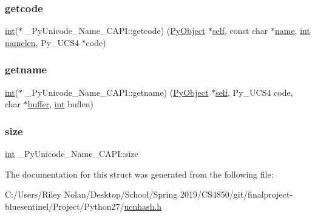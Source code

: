 \subsubsection{\texorpdfstring{getcode}{getcode}}
{\footnotesize\ttfamily \mbox{\hyperlink{warnings_8h_a74f207b5aa4ba51c3a2ad59b219a423b}{int}}($\ast$ \+\_\+\+Py\+Unicode\+\_\+\+Name\+\_\+\+C\+A\+P\+I\+::getcode) (\mbox{\hyperlink{_python27_2object_8h_aadc84ac7aed2cfa6f20c25f62bf3dac7}{Py\+Object}} $\ast$\mbox{\hyperlink{modsupport_8h_a0180ca1808366e5da641475e8bf8cca3}{self}}, const char $\ast$\mbox{\hyperlink{structname}{name}}, \mbox{\hyperlink{warnings_8h_a74f207b5aa4ba51c3a2ad59b219a423b}{int}} \mbox{\hyperlink{_s_d_l__opengl__glext_8h_a530c192f48a964d8ff63cc011b1459bb}{namelen}}, Py\+\_\+\+U\+C\+S4 $\ast$code)}

\mbox{\label{struct___py_unicode___name___c_a_p_i_a78b09e5d34c24880c4e24ca6cb51dda9}} 
\subsubsection{\texorpdfstring{getname}{getname}}
{\footnotesize\ttfamily \mbox{\hyperlink{warnings_8h_a74f207b5aa4ba51c3a2ad59b219a423b}{int}}($\ast$ \+\_\+\+Py\+Unicode\+\_\+\+Name\+\_\+\+C\+A\+P\+I\+::getname) (\mbox{\hyperlink{_python27_2object_8h_aadc84ac7aed2cfa6f20c25f62bf3dac7}{Py\+Object}} $\ast$\mbox{\hyperlink{modsupport_8h_a0180ca1808366e5da641475e8bf8cca3}{self}}, Py\+\_\+\+U\+C\+S4 code, char $\ast$\mbox{\hyperlink{classbuffer}{buffer}}, \mbox{\hyperlink{warnings_8h_a74f207b5aa4ba51c3a2ad59b219a423b}{int}} buflen)}

\mbox{\label{struct___py_unicode___name___c_a_p_i_a9faa2e068f88013c2c25a94a7df9c391}} 
\subsubsection{\texorpdfstring{size}{size}}
{\footnotesize\ttfamily \mbox{\hyperlink{warnings_8h_a74f207b5aa4ba51c3a2ad59b219a423b}{int}} \+\_\+\+Py\+Unicode\+\_\+\+Name\+\_\+\+C\+A\+P\+I\+::size}



The documentation for this struct was generated from the following file\+:\begin{DoxyCompactItemize}
\item 
C\+:/\+Users/\+Riley Nolan/\+Desktop/\+School/\+Spring 2019/\+C\+S4850/git/finalproject-\/bluesentinel/\+Project/\+Python27/\mbox{\hyperlink{ucnhash_8h}{ucnhash.\+h}}\end{DoxyCompactItemize}
